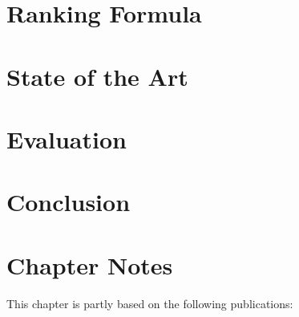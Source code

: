 \section{Ranking Formula}

\section{State of the Art}

\section{Evaluation}

\section{Conclusion}

\section*{Chapter Notes}
This chapter is partly based on the following publications:
